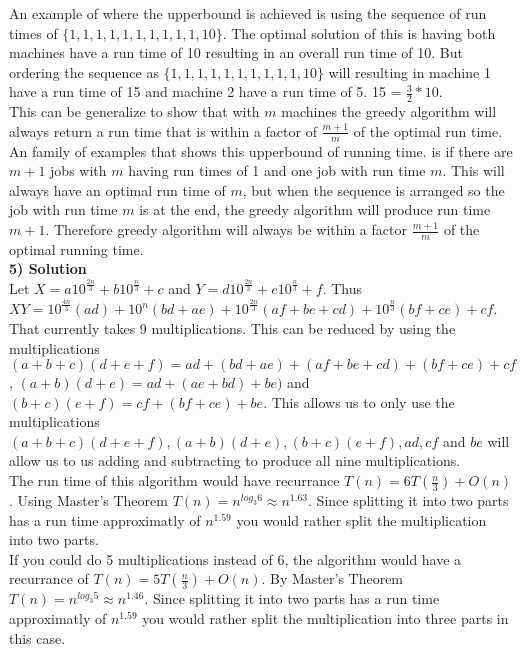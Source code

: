\documentclass[11pt]{article}
\begin{document}
An example of where the upperbound is achieved is using the sequence of run times of $\{1,1,1,1,1,1,1,1,1,1,10\}$.  The optimal solution of this is having both machines have a run time of 10 resulting in an overall run time of 10. But ordering the sequence as $\{1,1,1,1,1,1,1,1,1,1,10\}$ will resulting in machine 1 have a run time of 15 and machine 2 have a run time of 5. 15 = $\frac{3}{2}*10$. \\
This can be generalize to show that with $m$ machines the greedy algorithm will always return a run time that is within a factor of $\frac{m+1}{m}$ of the optimal run time. An family of examples that shows this upperbound of running time. is if there are $m+1$ jobs with $m$ having run times of 1 and one job with run time $m$. This will always have an optimal run time of $m$, but when the sequence is arranged so the job with run time $m$ is at the end, the greedy algorithm will produce run time $m+1$. Therefore greedy algorithm will always be within a factor $\frac{m+1}{m}$ of the optimal running time.\\

\textbf{5) Solution}\\
Let $X=a10^{\frac{2n}{3}} + b10^{\frac{n}{3}}+ c$ and $Y=d 10^{\frac{2n}{3}} + e10^{\frac{n}{3}} +f$. Thus $XY = 10^{\frac{4n}{3}}(ad) + 10^n(bd+ae)  + 10^{\frac{2n}{3}}(af+be+cd) + 10^{\frac{n}{3}} (bf+ce) +cf$. That currently takes 9 multiplications. This can be reduced by using the multiplications $(a+b+c)(d+e+f) = ad + (bd+ae) + (af+be+cd)+(bf+ce)+cf$, $(a+b)(d+e) = ad+ (ae+bd)+be)$ and $(b+c)(e+f) = cf+(bf+ce)+be$. This allows us to only use the multiplications $(a+b+c)(d+e+f), (a+b)(d+e), (b+c)(e+f), ad, cf$ and $be$ will allow us to us adding and subtracting to produce all nine multiplications.\\
The run time of this algorithm would have recurrance $T(n) = 6T(\frac{n}{3}) + O(n)$. Using Master's Theorem $T(n) = n^{log_3 6} \approx n^{1.63}$. Since splitting it into two parts has a run time approximatly of $n^{1.59}$ you would rather split the multiplication into two parts.\\
If you could do 5 multiplications instead of 6, the algorithm would have a recurrance of $T(n) = 5T(\frac{n}{3}) + O(n)$. By Master's Theorem $T(n) = n^{log_3 5} \approx n^{1.46}$.  Since splitting it into two parts has a run time approximatly of $n^{1.59}$ you would rather split the multiplication into three parts in this case.
\end{document}
